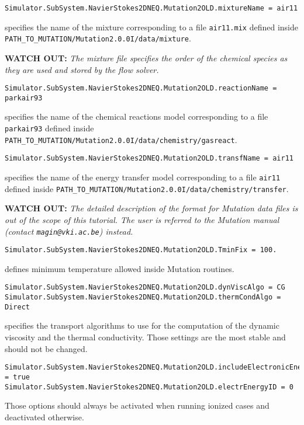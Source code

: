 \documentclass[11pt]{article}
\begin{document}
\begin{verbatim}
Simulator.SubSystem.NavierStokes2DNEQ.Mutation2OLD.mixtureName = air11
\end{verbatim}
specifies the name of the mixture corresponding to a file {\tt air11.mix} defined inside \\
{\tt PATH\_TO\_MUTATION/Mutation2.0.0I/data/mixture}.

{\bf WATCH OUT:} {\it The mixture file specifies the order of the chemical species as they are used and stored by the flow solver.}  

\begin{verbatim}
Simulator.SubSystem.NavierStokes2DNEQ.Mutation2OLD.reactionName = parkair93
\end{verbatim}
specifies the name of the chemical reactions model corresponding to a file {\tt parkair93} defined inside 
{\tt PATH\_TO\_MUTATION/Mutation2.0.0I/data/chemistry/gasreact}.

\begin{verbatim}
Simulator.SubSystem.NavierStokes2DNEQ.Mutation2OLD.transfName = air11
\end{verbatim}
specifies the name of the energy transfer model corresponding to a file {\tt air11} defined inside 
{\tt PATH\_TO\_MUTATION/Mutation2.0.0I/data/chemistry/transfer}.

{\bf WATCH OUT:} {\it The detailed description of the format for Mutation data files is out of the scope of this tutorial. 
  The user is referred to the Mutation manual (contact {\tt magin@vki.ac.be}) instead.}  

\begin{verbatim}
Simulator.SubSystem.NavierStokes2DNEQ.Mutation2OLD.TminFix = 100.
\end{verbatim}
defines minimum temperature allowed inside Mutation routines.

\begin{verbatim}
Simulator.SubSystem.NavierStokes2DNEQ.Mutation2OLD.dynViscAlgo = CG
Simulator.SubSystem.NavierStokes2DNEQ.Mutation2OLD.thermCondAlgo = Direct
\end{verbatim}
specifies the transport algorithms to use for the computation of the dynamic viscosity and the thermal conductivity.
Those settings are the most stable and should not be changed.

\begin{verbatim}
Simulator.SubSystem.NavierStokes2DNEQ.Mutation2OLD.includeElectronicEnergy = true
Simulator.SubSystem.NavierStokes2DNEQ.Mutation2OLD.electrEnergyID = 0
\end{verbatim}
Those options should always be activated when running ionized cases and deactivated otherwise.
\end{document}
